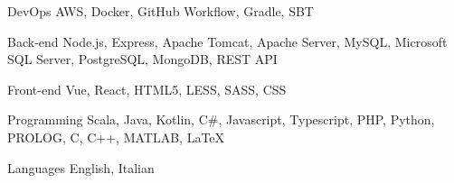 

\begin{cvskills}

  \cvskill
    {DevOps} %
    {AWS, Docker, GitHub Workflow, Gradle, SBT} %

  \cvskill
    {Back-end} %
    {Node.js, Express, Apache Tomcat, Apache Server, MySQL, Microsoft SQL Server, PostgreSQL, MongoDB, REST API} %

  \cvskill
    {Front-end} %
    {Vue, React, HTML5, LESS, SASS, CSS} %

  \cvskill
    {Programming} %
    {Scala, Java, Kotlin, C\#, Javascript, Typescript, PHP, Python, PROLOG, C, C++, MATLAB, LaTeX} %

  \cvskill
    {Languages} %
    {English, Italian} %

\end{cvskills}
